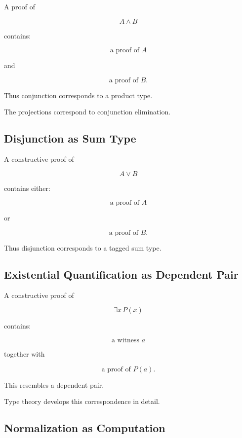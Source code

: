 A proof of

\[
A\land B
\]

contains:

\[
\boxed{
\text{a proof of }A
}
\]

and

\[
\boxed{
\text{a proof of }B.
}
\]

Thus conjunction corresponds to a product type.

The projections correspond to conjunction elimination.

\subsection{Disjunction as Sum Type}
\label{subsec:disjunction-sum-type}

A constructive proof of

\[
A\lor B
\]

contains either:

\[
\boxed{
\text{a proof of }A
}
\]

or

\[
\boxed{
\text{a proof of }B.
}
\]

Thus disjunction corresponds to a tagged sum type.

\subsection{Existential Quantification as Dependent Pair}
\label{subsec:existential-dependent-pair}

A constructive proof of

\[
\exists x\,P(x)
\]

contains:

\[
\boxed{
\text{a witness }a
}
\]

together with

\[
\boxed{
\text{a proof of }P(a).
}
\]

This resembles a dependent pair.

Type theory develops this correspondence in detail.

\subsection{Normalization as Computation}
\label{subsec:normalization-as-computation}

